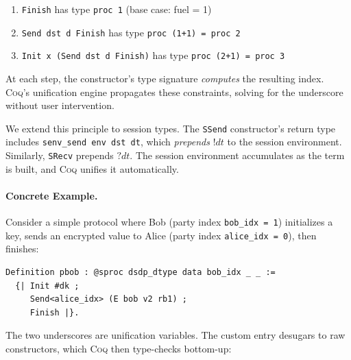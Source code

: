 \documentclass[11pt]{article}
\newcommand{\coqin}[1]{\texttt{#1}}
\newcommand{\coq}{\textsc{Coq}}
\begin{document}
\begin{enumerate}
  \item \coqin{Finish} has type \coqin{proc 1} (base case: fuel = 1)
  \item \coqin{Send dst d Finish} has type \coqin{proc (1+1) = proc 2}
  \item \coqin{Init x (Send dst d Finish)} has type \coqin{proc (2+1) = proc 3}
\end{enumerate}

\noindent
At each step, the constructor's type signature \emph{computes} the resulting
index. \coq{}'s unification engine propagates these constraints, solving for
the underscore without user intervention.

We extend this principle to session types. The \coqin{SSend} constructor's
return type includes \coqin{senv\_send env dst dt}, which \emph{prepends}
$\mathsf{!}dt$ to the session environment. Similarly, \coqin{SRecv} prepends
$\mathsf{?}dt$. The session environment accumulates as the term is built,
and \coq{} unifies it automatically.

\paragraph{Concrete Example.}
Consider a simple protocol where Bob (party index \coqin{bob\_idx = 1})
initializes a key, sends an encrypted value to Alice (party index
\coqin{alice\_idx = 0}), then finishes:

\begin{verbatim}
Definition pbob : @sproc dsdp_dtype data bob_idx _ _ :=
  {| Init #dk ;
     Send<alice_idx> (E bob v2 rb1) ;
     Finish |}.
\end{verbatim}

\noindent
The two underscores are unification variables. The custom entry desugars to
raw constructors, which \coq{} then type-checks bottom-up:
\end{document}
